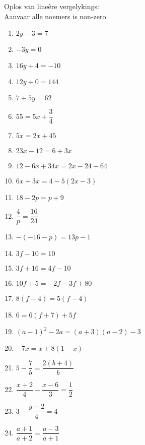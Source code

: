 \begin{exercises}{}
{
Oplos van lineêre vergelykings: \\
Aanvaar alle noemers is non-zero.
\begin{multicols}{2}
\begin{enumerate}[noitemsep, label=\textbf{\arabic*}. ] 
\item   $2y-3=7$
\item   $-3y=0$        
\item   $16y+4=-10$        
\item   $12y+0=144$
\item   $7+5y=62$   \vspace{6pt}     
\item  $55=5x+\dfrac{3}{4}$ \vspace{6pt}
\item   $5x=2x+45$        
\item  $23x-12=6+3x$
\item   $12-6x+34x=2x-24-64$
\item   $6x+3x=4-5(2x-3)$
\item   $18-2p=p+9$   \vspace{6pt}
\item   $\dfrac{4}{p}=\dfrac{16}{24}$
\item   $-(-16-p)=13p-1$
\item   $3f-10=10$
\item   $3f+16=4f-10$
\item   $10f+5=-2f-3f+80$
\item   $8(f-4)=5(f-4)$
\item  $6=6(f+7)+5f$      
\item $(a-1)^{2} - 2a = (a+3)(a-2) - 3$
\item $-7x = x+8(1-x)$ \vspace{6pt}
\item $5-\dfrac{7}{b} = \dfrac{2(b+4)}{b}$\vspace{6pt}
\item $\dfrac{x+2}{4} - \dfrac{x-6}{3} = \dfrac{1}{2}$\vspace{6pt}
\item $ 3 - \dfrac{y-2}{4} = 4$\vspace{6pt}
\item $ \dfrac{a+1}{a+2} = \dfrac{a-3}{a+1}$
  
\end{enumerate}
\end{multicols}

}
\end{exercises}

